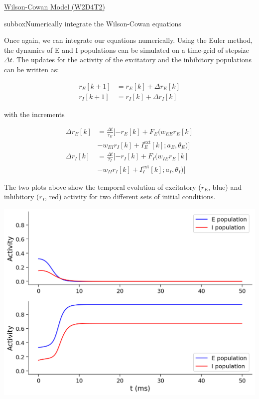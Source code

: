 \begin{textbox}{\href{https://compneuro.neuromatch.io/tutorials/W2D4_DynamicNetworks/chapter_title.html}{Wilson-Cowan Model (W2D4T2)} }
\begin{subbox}{subbox}{Numerically integrate the Wilson-Cowan equations}
\scriptsize

Once again, we can integrate our equations numerically. Using the Euler method, the dynamics of E and I populations can be simulated on a time-grid of stepsize $\Delta t$. The updates for the activity of the excitatory and the inhibitory populations can be written as:

\begin{align*}
r_E[k+1] &= r_E[k] + \Delta r_E[k]\\
r_I[k+1] &= r_I[k] + \Delta r_I[k] 
\end{align*}

with the increments

\begin{align*}
\Delta r_E[k] &= \frac{\Delta t}{\tau_E}[-r_E[k] + F_E(w_{EE}r_E[k] \\
&-w_{EI}r_I[k] + I^{\text{ext}}_E[k];a_E,\theta_E)]\\
\Delta r_I[k] &= \frac{\Delta t}{\tau_I}[-r_I[k] + F_I(w_{IE}r_E[k] \\
&-w_{II}r_I[k] + I^{\text{ext}}_I[k];a_I,\theta_I)] 
\end{align*}

The two plots above show the temporal evolution of excitatory ($r_E$, blue) and inhibitory ($r_I$, red) activity for two different sets of initial conditions.

\begin{center}
\includegraphics[scale=0.3]{Figures/DN/DN_Figure6.png}
\end{center}
\end{subbox}

\end{textbox}
